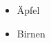 \documentclass{article}
\begin{document}
  \begin{itemize}
    \item Äpfel
    \item Birnen
  \end{itemize}
\end{document}
